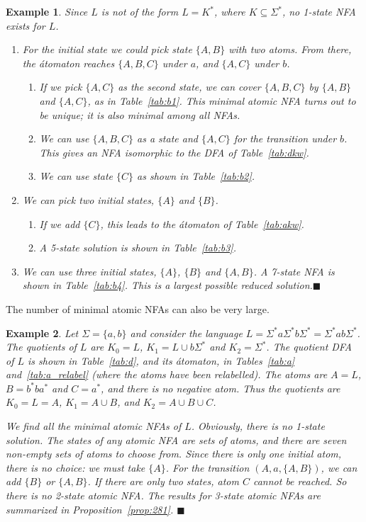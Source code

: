 \documentclass[preprint,12pt]{elsarticle}
\newcommand{\Sig}{\Sigma}
\newcommand{\be}{\begin{enumerate}}
\newcommand{\ee}{\end{enumerate}}
\newcommand{\qedb}{\hfill$\blacksquare$}
\newtheorem{example}{Example}
\begin{document}
\begin{example}
Since $L$ is not of the form $L=K^*$, where $K\subseteq \Sig^*$, 
no 1-state NFA exists for $L$.
\be
\item 
For the initial state we could pick state $\{A,B\}$ with two atoms.  From there, the \'atomaton reaches 
$\{A,B,C\}$ under $a$, and  $\{A,C\}$ under $b$. 
        \be
        \item
If we pick $\{A,C\}$
as the second state,  we can cover $\{A,B,C\}$ by $\{A,B\}$ and 
$\{A,C\}$, as  in Table~\ref{tab:b1}. This minimal
atomic NFA turns out to be unique; it is also minimal among all NFAs.
        \item
        We can use $\{A,B,C\}$ as a state and $\{A,C\}$
        for the transition under $b$. This gives an NFA  isomorphic to the DFA of Table~\ref{tab:dkw}.
        \item
        We can use state $\{C\}$
        as shown in Table~\ref{tab:b2}.
        \ee
\item
We can pick two initial states, $\{A\}$ and $\{B\}$. 
        \be
        \item
        If we add $\{C\}$, this leads to the  \'atomaton of Table~\ref{tab:akw}.
        \item
        A 5-state solution is shown in Table~\ref{tab:b3}.
        \ee
\item
We can use three initial states, $\{A\}$, $\{B\}$ and $\{A,B\}$. 
        A 7-state NFA is shown in  Table~\ref{tab:b4}. This 
           is a largest possible reduced solution.\qedb
\ee

\end{example}




The number of minimal atomic NFAs can also be very large. 
\begin{example}
\label{ex:atomicminimal}
Let $\Sig=\{a,b\}$ and consider the language $L=\Sig^*a\Sig^*b\Sig^*=\Sig^*ab\Sig^*$.
The quotients of $L$ are $K_0=L$, $K_1=L\cup b\Sig^*$ and $K_2=\Sig^*$.
The quotient DFA of $L$ is shown in Table~\ref{tab:d}, and its \'atomaton, in Tables~\ref{tab:a} and~\ref{tab:a_relabel} (where the atoms have been relabelled). 
The atoms  are $A=L$, $B=b^*ba^*$ and $C=a^*$, and there is no negative atom.
Thus the quotients are $K_0=L=A$, $K_1=A\cup B$, and $K_2=A\cup B\cup C$.

We find all the minimal atomic NFAs of $L$.
Obviously, there is no 1-state solution.
The states of any atomic NFA are sets of atoms, and 
there are seven non-empty sets of atoms to choose from. 
Since there is only one initial atom, there is no choice: we must take $\{A\}$.
For the transition $(A,a,\{A,B\})$, we can add $\{B\}$ or $\{A,B\}$. 
If there are only two states, atom $C$ cannot be reached. So there is no  2-state atomic NFA.
The results for 3-state atomic NFAs  are summarized in Proposition~\ref{prop:281}. 
\qedb
\end{example}
\end{document}
